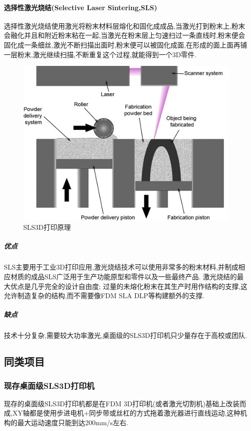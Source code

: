 \documentclass[a4paper,12pt,onecolumn,twoside]{article}
\begin{document}
\paragraph{选择性激光烧结(Selective Laser Sintering,SLS)}
选择性激光烧结使用激光将粉末材料层熔化和固化成成品,当激光打到粉末上,粉末会融化并且和附近粉末粘在一起,当激光在粉末层上匀速扫过一条直线时,粉末便会固化成一条细丝,激光不断扫描出面时,粉末便可以被固化成面,在形成的面上面再铺一层粉末,激光继续扫描,不断重复这个过程,就能得到一个3D零件.
\begin{figure}[ht]
\centering     
\includegraphics[width=0.9\linewidth]{SLS0.jpg}
\caption{SLS3D打印原理}
\end{figure}
\subparagraph{优点}
SLS主要用于工业3D打印应用,激光烧结技术可以使用非常多的粉末材料,并制成相应材质的成品SLS广泛用于生产功能原型和零件以及一些最终产品. 激光烧结的最大优点是几乎完全的设计自由度; 过量的未熔化粉末在其生产时用作结构的支撑,这允许制造复杂的结构,而不需要像FDM SLA DLP等构建额外的支撑.
\subparagraph{缺点}
技术十分复杂,需要较大功率激光,桌面级的SLS3D打印机只少量存在于高校或团队. 
\subsection{同类项目}
\subsubsection{现存桌面级SLS3D打印机}
现存的桌面级SLS3D打印机都是在FDM 3D打印机(或者激光切割机)基础上改装而成,XY轴都是使用步进电机+同步带或丝杠的方式拖着激光器进行直线运动,这种机构的最大运动速度只能到达200mm/s左右.
\end{document}
